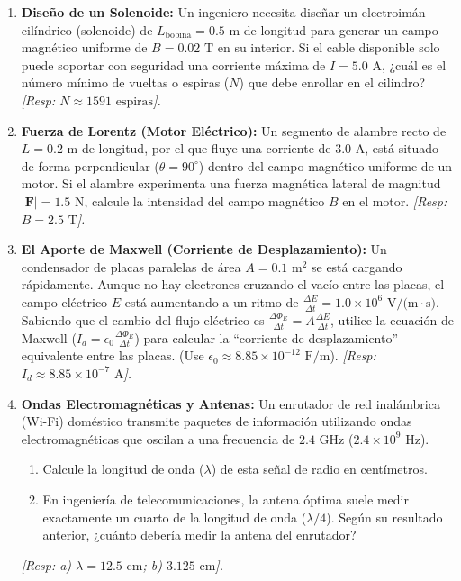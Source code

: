 \documentclass[11pt,a4paper]{book}
\begin{document}
\begin{enumerate}
    \item \textbf{Diseño de un Solenoide:} Un ingeniero necesita diseñar un electroimán cilíndrico (solenoide) de $L_{\text{bobina}} = 0.5 \text{ m}$ de longitud para generar un campo magnético uniforme de $B = 0.02 \text{ T}$ en su interior. Si el cable disponible solo puede soportar con seguridad una corriente máxima de $I = 5.0 \text{ A}$, ¿cuál es el número mínimo de vueltas o espiras ($N$) que debe enrollar en el cilindro?
    \textit{[Resp: $N \approx 1591 \text{ espiras}$].}

    \item \textbf{Fuerza de Lorentz (Motor Eléctrico):} Un segmento de alambre recto de $L = 0.2 \text{ m}$ de longitud, por el que fluye una corriente de $3.0 \text{ A}$, está situado de forma perpendicular ($\theta = 90^\circ$) dentro del campo magnético uniforme de un motor. Si el alambre experimenta una fuerza magnética lateral de magnitud $|\boldsymbol{F}| = 1.5 \text{ N}$, calcule la intensidad del campo magnético $B$ en el motor.
    \textit{[Resp: $B = 2.5 \text{ T}$].}

    \item \textbf{El Aporte de Maxwell (Corriente de Desplazamiento):} Un condensador de placas paralelas de área $A = 0.1 \text{ m}^2$ se está cargando rápidamente. Aunque no hay electrones cruzando el vacío entre las placas, el campo eléctrico $E$ está aumentando a un ritmo de $\frac{\Delta E}{\Delta t} = 1.0 \times 10^6 \text{ V/(m}\cdot\text{s)}$. Sabiendo que el cambio del flujo eléctrico es $\frac{\Delta \Phi_E}{\Delta t} = A \frac{\Delta E}{\Delta t}$, utilice la ecuación de Maxwell ($I_d = \epsilon_0 \frac{\Delta \Phi_E}{\Delta t}$) para calcular la ``corriente de desplazamiento'' equivalente entre las placas. (Use $\epsilon_0 \approx 8.85 \times 10^{-12} \text{ F/m}$).
    \textit{[Resp: $I_d \approx 8.85 \times 10^{-7} \text{ A}$].}

    \item \textbf{Ondas Electromagnéticas y Antenas:} Un enrutador de red inalámbrica (Wi-Fi) doméstico transmite paquetes de información utilizando ondas electromagnéticas que oscilan a una frecuencia de $2.4 \text{ GHz}$ ($2.4 \times 10^9 \text{ Hz}$). 
    \begin{enumerate}
        \item Calcule la longitud de onda ($\lambda$) de esta señal de radio en centímetros.
        \item En ingeniería de telecomunicaciones, la antena óptima suele medir exactamente un cuarto de la longitud de onda ($\lambda/4$). Según su resultado anterior, ¿cuánto debería medir la antena del enrutador?
    \end{enumerate}
    \textit{[Resp: a) $\lambda = 12.5 \text{ cm}$; b) $3.125 \text{ cm}$].}


\end{enumerate}
\end{document}
